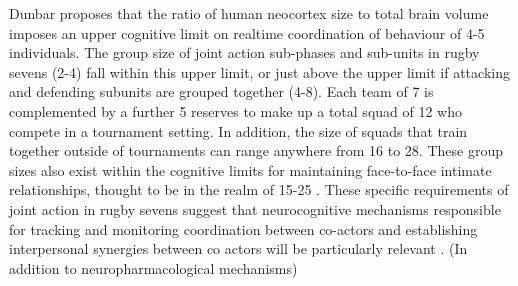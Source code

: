   Dunbar \textcite{Dunbar1992} proposes that the ratio of human neocortex size to total brain volume imposes an upper cognitive limit on realtime coordination of behaviour of  4-5 individuals.  The group size of joint action sub-phases and sub-units in rugby sevens (2-4) fall within this upper limit, or just above the upper limit if attacking and defending subunits are grouped together (4-8).  Each team of 7 is complemented by a further 5 reserves to make up a total squad of 12 who compete in a tournament setting.  In addition, the size of squads that train together outside of tournaments can range anywhere from 16 to 28.
  These group sizes also exist within the cognitive limits for maintaining face-to-face intimate relationships, thought to be in the realm of 15-25 \citep{Dunbar1992,Dunbar2010}. These specific requirements of joint action in rugby sevens suggest that neurocognitive mechanisms responsible for tracking and monitoring coordination between co-actors and establishing interpersonal synergies between co actors will be particularly relevant \citep{Mogan2017}. (In addition to neuropharmacological mechanisms)

